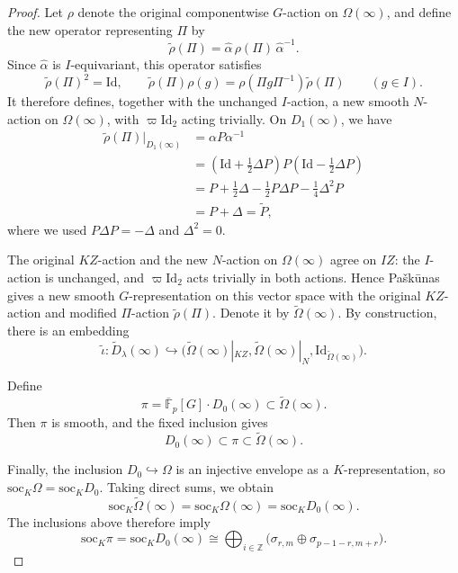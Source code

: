 \documentclass[10pt]{article}
\theoremstyle{plain}
\theoremstyle{definition}
\theoremstyle{remark}
\newcommand{\Fpbar}{\overline{\mathbb{F}}_p}
\newcommand{\soc}{\mathrm{soc}}
\newcommand{\Id}{\mathrm{Id}}
\begin{document}
\begin{proof}
Let $\rho$ denote the original componentwise $G$-action on $\Omega(\infty)$, and define the new operator representing $\Pi$ by
\begin{equation}\label{eq:Omega-infinity-modified-Pi}
\widetilde\rho(\Pi)=\widehat\alpha\,\rho(\Pi)\,\widehat\alpha^{-1}.
\end{equation}
Since $\widehat\alpha$ is $I$-equivariant, this operator satisfies
\[
\widetilde\rho(\Pi)^2=\Id,\qquad
\widetilde\rho(\Pi)\rho(g)=\rho(\Pi g\Pi^{-1})\widetilde\rho(\Pi)
\qquad(g\in I).
\]
It therefore defines, together with the unchanged $I$-action, a new smooth $N$-action on $\Omega(\infty)$, with $\varpi\Id_2$ acting trivially. On $D_1(\infty)$, we have
\begin{align*}
\widetilde\rho(\Pi)|_{D_1(\infty)}
&=\alpha P\alpha^{-1}\\
&=\left(\Id+\frac12\Delta P\right)P
\left(\Id-\frac12\Delta P\right)\\
&=P+\frac12\Delta-\frac12P\Delta P-\frac14\Delta^2P\\
&=P+\Delta=\widetilde P,
\end{align*}
where we used $P\Delta P=-\Delta$ and $\Delta^2=0$.

The original $KZ$-action and the new $N$-action on $\Omega(\infty)$ agree on $IZ$: the $I$-action is unchanged, and $\varpi\Id_2$ acts trivially in both actions. Hence Pa\v{s}k\=unas~\cite[Corollary~5.5.5]{Pa04} gives a new smooth $G$-representation on this vector space with the original $KZ$-action and modified $\Pi$-action $\tilde{\rho}(\Pi)$. Denote it by $\widetilde\Omega(\infty)$. By construction, there is an embedding
\begin{equation}\label{eq:modified-diagram-embedding-Omega}
\widetilde\iota:\widetilde D_{\lambda}(\infty)\hookrightarrow
\bigl(\widetilde\Omega(\infty)|_{KZ},
\widetilde\Omega(\infty)|_N,\Id_{\widetilde\Omega(\infty)}\bigr).
\end{equation}

Define
\begin{equation}\label{eq:pi-definition}
\pi=\Fpbar[G]\cdot D_0(\infty)
\subset\widetilde\Omega(\infty).
\end{equation}
Then $\pi$ is smooth, and the fixed inclusion gives
\[
D_0(\infty)\subset\pi\subset\widetilde\Omega(\infty).
\]

Finally, the inclusion $D_0\hookrightarrow\Omega$ is an injective envelope as a $K$-representation, so $\soc_K\Omega=\soc_K D_0$. Taking direct sums, we obtain
\[
\soc_K\widetilde\Omega(\infty)
=\soc_K\Omega(\infty)
=\soc_K D_0(\infty).
\]
The inclusions above therefore imply
\begin{equation}\label{eq:pi-K-socle}
\soc_K\pi=\soc_K D_0(\infty)
\cong\bigoplus_{i\in\mathbb{Z}}
\bigl(\sigma_{r,m}\oplus\sigma_{p-1-r,m+r}\bigr).
\end{equation}
\end{proof}
\end{document}
